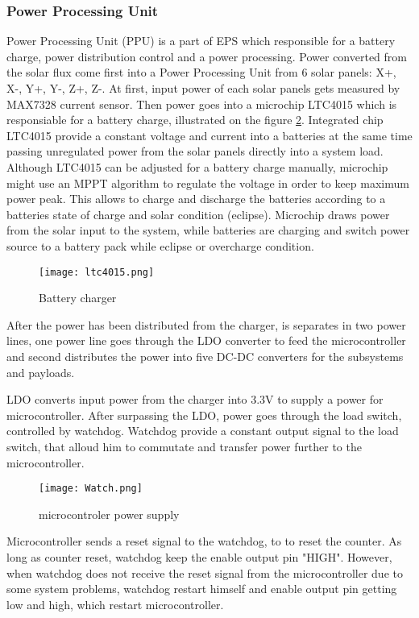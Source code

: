    \subsubsection{Power Processing Unit}
   Power Processing Unit (PPU) is a part of EPS which responsible for a battery charge, power distribution control and a power processing. 
   Power converted from the solar flux come first into a Power Processing Unit from 6 solar panels: X+, X-, Y+, Y-, Z+, Z-. At first, input power of each solar panels gets measured by MAX7328 current sensor. Then power goes into a microchip LTC4015 which is responsiable for a battery charge, illustrated on the figure \ref{fig: ltc4015}. Integrated chip LTC4015 provide a constant voltage and current into a batteries at the same time passing unregulated power from the solar panels directly into a system load. Although LTC4015 can be adjusted for a battery charge manually, microchip might use an MPPT algorithm to regulate the voltage in order to keep maximum power peak. This allows to charge and discharge the batteries according to a batteries state of charge and solar condition (eclipse). Microchip draws power from the solar input to the system, while batteries are charging and switch power source to a battery pack while eclipse or overcharge condition.
   
  \begin{figure}[h]
  	\centering
  	\texttt{[image: ltc4015.png]}
  	\caption{Battery charger}
  	\label{fig: ltc4015}
  \end{figure}
  
 After the power has been distributed from the charger, is separates in two power lines, one power line goes through the LDO converter to feed the microcontroller and second distributes the power into five DC-DC converters for the subsystems and payloads.
 
 LDO converts input power from the charger into 3.3V to supply a power for microcontroller. After surpassing the LDO, power goes through the load switch, controlled by watchdog. Watchdog provide a constant output signal to the load switch, that alloud him to commutate and transfer power further to the microcontroller. 
  
    \begin{figure}[h]
    	\centering
    	\texttt{[image: Watch.png]}
    	\caption{microcontroler power supply}
    	\label{fig: ltc4015}
    \end{figure}
  Microcontroller sends a reset signal to the watchdog, to to reset the counter. As long as counter reset, watchdog keep the enable output pin "HIGH". However, when watchdog does not receive the reset signal from the microcontroller due to some system problems, watchdog restart himself and enable output pin getting low and high, which restart microcontroller.
  
